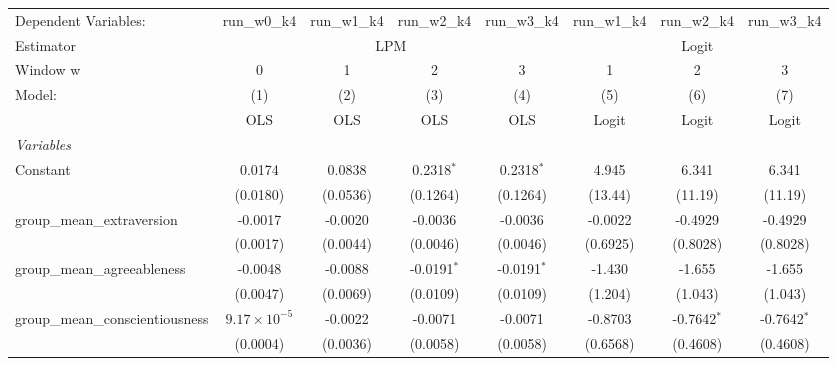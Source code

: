 \begin{tabular}{lccccccc}
   \tabularnewline \midrule \midrule
   Dependent Variables:             & run\_w0\_k4           & run\_w1\_k4    & run\_w2\_k4     & run\_w3\_k4     & run\_w1\_k4     & run\_w2\_k4     & run\_w3\_k4\\    
   Estimator & \multicolumn{4}{c}{LPM} & \multicolumn{3}{c}{Logit} \\ 
   Window w                         & 0                     & 1              & 2               & 3               & 1               & 2               & 3 \\   
   Model:                           & (1)                   & (2)            & (3)             & (4)             & (5)             & (6)             & (7)\\  
                                    &  OLS                  & OLS            & OLS             & OLS             & Logit           & Logit           & Logit\\  
   \midrule
   \emph{Variables}\\
   Constant                         & 0.0174                & 0.0838         & 0.2318$^{*}$    & 0.2318$^{*}$    & 4.945           & 6.341           & 6.341\\   
                                    & (0.0180)              & (0.0536)       & (0.1264)        & (0.1264)        & (13.44)         & (11.19)         & (11.19)\\   
   group\_mean\_extraversion        & -0.0017               & -0.0020        & -0.0036         & -0.0036         & -0.0022         & -0.4929         & -0.4929\\   
                                    & (0.0017)              & (0.0044)       & (0.0046)        & (0.0046)        & (0.6925)        & (0.8028)        & (0.8028)\\   
   group\_mean\_agreeableness       & -0.0048               & -0.0088        & -0.0191$^{*}$   & -0.0191$^{*}$   & -1.430          & -1.655          & -1.655\\   
                                    & (0.0047)              & (0.0069)       & (0.0109)        & (0.0109)        & (1.204)         & (1.043)         & (1.043)\\   
   group\_mean\_conscientiousness   & $9.17\times 10^{-5}$  & -0.0022        & -0.0071         & -0.0071         & -0.8703         & -0.7642$^{*}$   & -0.7642$^{*}$\\   
                                    & (0.0004)              & (0.0036)       & (0.0058)        & (0.0058)        & (0.6568)        & (0.4608)        & (0.4608)\\   

\end{tabular}
